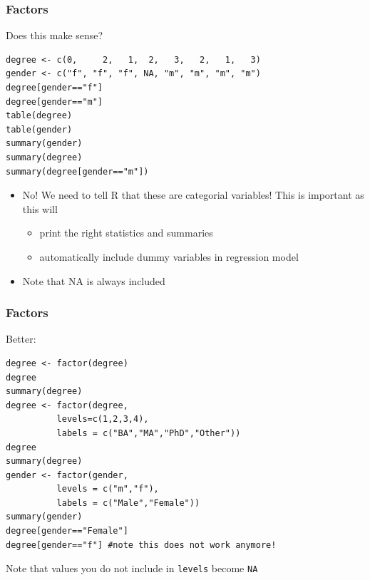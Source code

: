 \documentclass[xcolor={svgnames},10pt,
handout
]{beamer}
\begin{document}
\begin{frame}[fragile]\frametitle{Factors}
Does this make sense?
\begin{lstlisting}
degree <- c(0,     2,   1,  2,   3,   2,   1,   3)
gender <- c("f", "f", "f", NA, "m", "m", "m", "m")
degree[gender=="f"]
degree[gender=="m"]
table(degree)
table(gender)
summary(gender)
summary(degree)
summary(degree[gender=="m"])
\end{lstlisting}\pause
\begin{itemize}
\item No! We need to tell R that these are categorial variables! This is important as this will 
\begin{itemize}
\item print the right statistics and summaries
\item automatically include dummy variables in regression model
\end{itemize}
\item Note that NA is always included
\end{itemize}
\end{frame}


\begin{frame}[fragile]\frametitle{Factors}
Better:
\begin{lstlisting}
degree <- factor(degree)
degree
summary(degree)
degree <- factor(degree, 
		  levels=c(1,2,3,4),
		  labels = c("BA","MA","PhD","Other"))
degree
summary(degree)
gender <- factor(gender, 
		  levels = c("m","f"),
		  labels = c("Male","Female"))
summary(gender)
degree[gender=="Female"] 
degree[gender=="f"] #note this does not work anymore!
\end{lstlisting}
Note that values you do not include in \lstinline|levels| become \lstinline|NA|
\end{frame}

\end{document}
